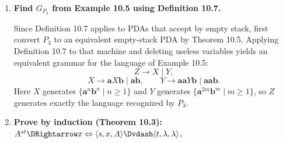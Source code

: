 \begin{enumerate}[{10.}1. ]
\begin{enumerate}
\item \textbf{DPDA}: Yes. The language has a fixed block structure: $\pmb{a}^i,\pmb{b}^j,\pmb{c}^j,\pmb{d}^i$, so the DPDA deterministically processes each block. The stack remembers $i$ (via $A$s) and $j$ (via $B$s overlaid on top). This is deterministic.

\item \textbf{Counting automaton}: No. A counting automaton has only one stack
symbol. After reading $\pmb{a}^i\pmb{b}^j$, its stack is just an undifferentiated
pile of identical markers. To accept this language it would need to know where
the $j$ markers for the middle comparison end and where the $i$ markers for the
outer comparison begin, so that the $\pmb{c}$'s can be matched against the
$\pmb{b}$'s first and the $\pmb{d}$'s against the $\pmb{a}$'s afterward. With only
one kind of stack symbol, that boundary cannot be marked.

\item \textbf{Grammar from PDA} (Definition 10.7): Applying Definition 10.7 to part (b) and simplifying yields the equivalent grammar
\[
S\rightarrow \pmb{a}S\pmb{d}\mid T,\qquad
T\rightarrow \pmb{b}T\pmb{c}\mid \lambda.
\]
Here $S$ preserves the outer $\pmb{a}/\pmb{d}$ count while $T$ handles the
middle $\pmb{b}/\pmb{c}$ count. After $i$ uses of
$S\to\pmb{a}S\pmb{d}$ and $j$ uses of
$T\to\pmb{b}T\pmb{c}$, the derived word is
$\pmb{a}^i\pmb{b}^j\pmb{c}^j\pmb{d}^i$.
\end{enumerate}

\item \textbf{Find $G_{P_3}$ from Example 10.5 using Definition 10.7.}

Since Definition 10.7 applies to PDAs that accept by empty stack, first convert $P_3$ to an equivalent empty-stack PDA by Theorem 10.5. Applying Definition 10.7 to that machine and deleting useless variables yields an equivalent grammar for the language of Example 10.5:
\[
Z\rightarrow X\mid Y,
\]
\[
X\rightarrow \pmb{a}X\pmb{b}\mid \pmb{ab},
\qquad
Y\rightarrow \pmb{aa}Y\pmb{b}\mid \pmb{aab}.
\]
Here $X$ generates $\{\pmb{a}^n\pmb{b}^n\mid n\geq 1\}$ and $Y$ generates $\{\pmb{a}^{2m}\pmb{b}^m\mid m\geq 1\}$, so $Z$ generates exactly the language recognized by $P_3$.

\item \textbf{Prove by induction (Theorem 10.3): $A^{st}\DRightarrow x \Leftrightarrow \langle s,x,A\rangle\Dvdash\langle t,\lambda,\lambda\rangle$.}


\end{enumerate}
